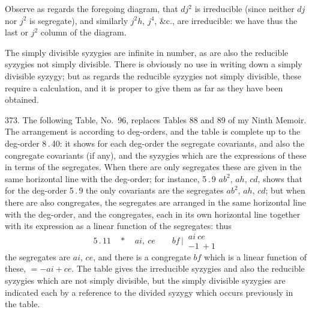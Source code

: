 \documentclass[11pt]{article}
\begin{document}

\noindent Observe as regards the foregoing diagram, that $dj^{2}$ is irreducible (since neither $dj$ nor $j^{2}$ is segregate), and similarly $j^{2}h$, $j^{4}$, \&c., are irreducible: we have thus the last or $j^{2}$ column of the diagram.

The simply divisible syzygies are infinite in number, as are also the reducible syzygies not simply divisible. There is obviously no use in writing down a simply divisible syzygy; but as regards the reducible syzygies not simply divisible, these require a calculation, and it is proper to give them as far as they have been obtained.

373. The following Table, No.\ 96, replaces Tables 88 and 89 of my Ninth Memoir. The arrangement is according to deg-orders, and the table is complete up to the deg-order 8\,.\,40: it shows for each deg-order the segregate covariants, and also the congregate covariants (if any), and the syzygies which are the expressions of these in terms of the segregates. When there are only segregates these are given in the same horizontal line with the deg-order; for instance, 5\,.\,9 $ab^{2}$, $ah$, $cd$, shows that for the deg-order 5\,.\,9 the only covariants are the segregates $ab^{2}$, $ah$, $cd$; but when there are also congregates, the segregates are arranged in the same horizontal line with the deg-order, and the congregates, each in its own horizontal line together with its expression as a linear function of the segregates: thus
\[
5\,.\,11\quad *\quad ai,\ ce \qquad bf \,\Big|\, \begin{array}{c} ai\ ce \\ -1\ +1 \end{array}
\]
the segregates are $ai$, $ce$, and there is a congregate $bf$ which is a linear function of these, $= -ai + ce$. The table gives the irreducible syzygies and also the reducible syzygies which are not simply divisible, but the simply divisible syzygies are indicated each by a reference to the divided syzygy which occurs previously in the table.
\end{document}
